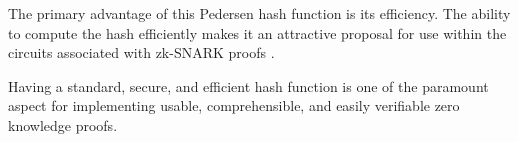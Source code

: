 
The primary advantage of this Pedersen hash function is its efficiency.
The ability to compute the hash efficiently makes it an attractive proposal for use
within the circuits associated with zk-SNARK proofs \cite{efficiency}.

Having a standard, secure, and efficient hash function is one of the paramount aspect for implementing
usable, comprehensible, and easily verifiable zero knowledge proofs.
